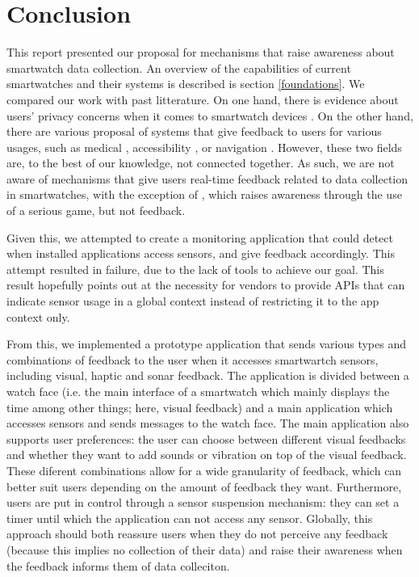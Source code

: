 \documentclass[conference, a4paper, 10pt, twocolumn]{IEEEtran}
\begin{document}
\section{\textbf{Conclusion}}\label{conclusion}
This report presented our proposal for mechanisms that raise awareness about smartwatch data collection. An overview of the capabilities of current smartwatches and their systems is described is section \ref{foundations}. We compared our work with past litterature. On one hand, there is evidence about users' privacy concerns when it comes to smartwatch devices \cite{udoh2016privacy,datta2018survey,motti2015users}. On the other hand, there are various proposal of systems that give feedback to users for various usages, such as medical \cite{lee2019smartwatch}, accessibility \cite{goodman2020evaluating}, or navigation \cite{dobbelstein2016unconstrained}. However, these two fields are, to the best of our knowledge, not connected together. As such, we are not aware of mechanisms that give users real-time feedback related to data collection in smartwatches, with the exception of \cite{williams2019smart}, which raises awareness through the use of a serious game, but not feedback. 

Given this, we attempted to create a monitoring application that could detect when installed applications access sensors, and give feedback accordingly. This attempt resulted in failure, due to the lack of tools to achieve our goal. This result hopefully points out at the necessity for vendors to provide \acp{API} that can indicate sensor usage in a global context instead of restricting it to the app context only. 

From this, we implemented a prototype application that sends various types and combinations of feedback to the user when it accesses smartwartch sensors, including visual, haptic and sonar feedback. The application is divided between a watch face (i.e. the main interface of a smartwatch which mainly displays the time among other things; here, visual feedback) and a main application which accesses sensors and sends messages to the watch face. The main application also supports user preferences: the user can choose between different visual feedbacks and whether they want to add sounds or vibration on top of the visual feedback. These diferent combinations allow for a wide granularity of feedback, which can better suit users depending on the amount of feedback they want. Furthermore, users are put in control through a sensor suspension mechanism: they can set a timer until which the application can not access any sensor. Globally, this approach should both reassure users when they do not perceive any feedback (because this implies no collection of their data) and raise their awareness when the feedback informs them of data colleciton.  
\end{document}
